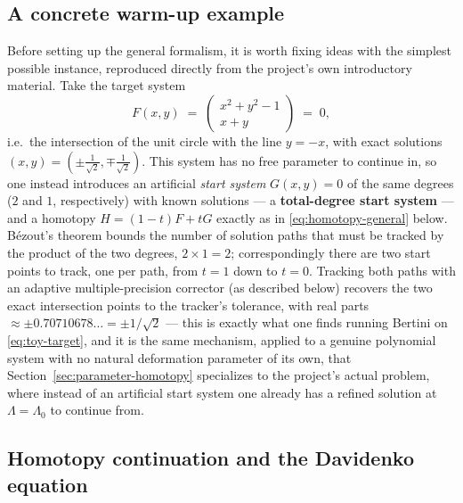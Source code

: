 \documentclass[11pt]{article}
\begin{document}
\subsection{A concrete warm-up example}
\label{sec:warmup}

Before setting up the general formalism, it is worth fixing ideas with the
simplest possible instance, reproduced directly from the project's own
introductory material. Take the target system
\begin{equation}
  \label{eq:toy-target}
  F(x,y) \;=\; \begin{pmatrix} x^2+y^2-1 \\ x+y \end{pmatrix} \;=\; 0,
\end{equation}
i.e.\ the intersection of the unit circle with the line $y=-x$, with
exact solutions $(x,y)=(\pm\tfrac{1}{\sqrt2},\mp\tfrac{1}{\sqrt2})$. This
system has no free parameter to continue in, so one instead introduces an
artificial \emph{start system} $G(x,y)=0$ of the same degrees ($2$ and
$1$, respectively) with known solutions --- a \textbf{total-degree start
system} --- and a homotopy $H=(1-t)F+tG$ exactly as in
\eqref{eq:homotopy-general} below. Bézout's theorem bounds the number of
solution paths that must be tracked by the product of the two degrees,
$2\times1=2$; correspondingly there are two start points to track, one
per path, from $t=1$ down to $t=0$. Tracking both paths with an adaptive
multiple-precision corrector (as described below) recovers the two exact
intersection points to the tracker's tolerance, with real parts
$\approx\pm0.70710678\ldots=\pm1/\sqrt2$ --- this is exactly what one
finds running Bertini on \eqref{eq:toy-target}, and it is the same
mechanism, applied to a genuine polynomial system with no natural
deformation parameter of its own, that Section~\ref{sec:parameter-homotopy}
specializes to the project's actual problem, where instead of an
artificial start system one already has a refined solution at
$\Lambda=\Lambda_0$ to continue from.

\subsection{Homotopy continuation and the Davidenko equation}
\end{document}
